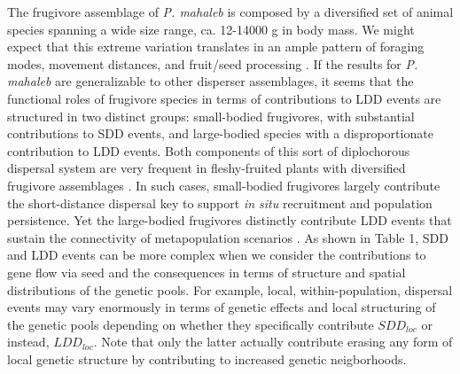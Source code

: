 \documentclass[a4paper, 12pt]{article}
\begin{document}
\begin{linenumbers}
The frugivore assemblage of \textit{P. mahaleb} is composed by a diversified set of animal species spanning a wide size range, ca. 12-14000 g in body mass. We might expect that this extreme variation translates in an ample pattern of foraging modes, movement distances, and fruit/seed processing \citep{Jordano:2000ft}. If the results for \textit{P. mahaleb} are generalizable to other disperser assemblages, it seems that the functional roles of frugivore species in terms of contributions to LDD events are structured in two distinct groups: small-bodied frugivores, with substantial contributions to SDD events, and large-bodied species with a disproportionate contribution to LDD events. Both components of this sort of diplochorous \citep{vanderWall:2004hv} dispersal system are very frequent in fleshy-fruited plants with diversified frugivore assemblages \citep{Galetti:2013jv}. In such cases, small-bodied frugivores largely contribute the short-distance dispersal key to support \textit{in situ} recruitment and population persistence. Yet the large-bodied frugivores distinctly contribute LDD events that sustain the connectivity of metapopulation scenarios \citep{Urban:2001}. As shown in Table 1, SDD and LDD events can be more complex when we consider the contributions to gene flow via seed and the consequences in terms of structure and spatial distributions of the genetic pools. For example, local, within-population, dispersal events may vary enormously in terms of genetic effects and local structuring of the genetic pools depending on whether they specifically contribute $SDD_{loc}$ or instead, $LDD_{loc}$. Note that only the latter actually contribute erasing any form of local genetic structure by contributing to increased genetic neigborhoods.


\end{linenumbers}
\end{document}

